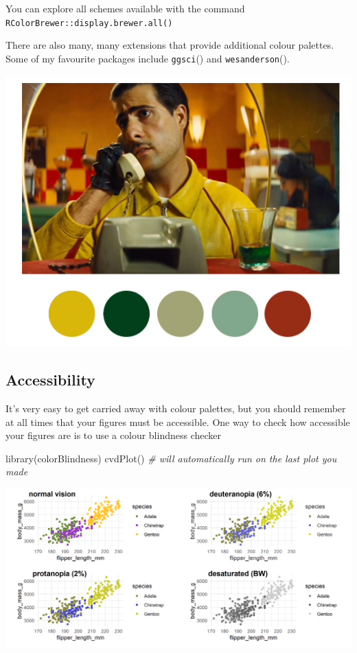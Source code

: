 \documentclass[
]{book}
\makeatletter
\newenvironment{Shaded}{\begin{snugshade}}{\end{snugshade}}
\newcommand{\CommentTok}[1]{\textcolor[rgb]{0.56,0.35,0.01}{\textit{#1}}}
\newcommand{\FunctionTok}[1]{\textcolor[rgb]{0.00,0.00,0.00}{#1}}
\newcommand{\NormalTok}[1]{#1}
\newenvironment{kframe}{%
\medskip{}
\setlength{\fboxsep}{.8em}
 \def\at@end@of@kframe{}%
 \ifinner\ifhmode%
  \def\at@end@of@kframe{\end{minipage}}%
  \begin{minipage}{\columnwidth}%
 \fi\fi%
 \def\FrameCommand##1{\hskip\@totalleftmargin \hskip-\fboxsep
 \colorbox{shadecolor}{##1}\hskip-\fboxsep
     \hskip-\linewidth \hskip-\@totalleftmargin \hskip\columnwidth}%
 \MakeFramed {\advance\hsize-\width
   \@totalleftmargin\z@ \linewidth\hsize
   \@setminipage}}%
 {\par\unskip\endMakeFramed%
 \at@end@of@kframe}
\newenvironment{block}[1]
  {
  \begin{itemize}
  \renewcommand{\labelitemi}{
    \raisebox{-.7\height}[0pt][0pt]{
      {\setkeys{Gin}{width=3em,keepaspectratio}\texttt{[image: images/\#1]}}
    }
  }
  \setlength{\fboxsep}{1em}
  \begin{kframe}
  \item
  }
  {
  \end{kframe}
  \end{itemize}
  }
\newenvironment{rmdwarning}
  {\begin{block}{warning}}
  {\end{block}}
\makeatother
\begin{document}
\begin{rmdwarning}
You can explore all schemes available with the command
\texttt{RColorBrewer::display.brewer.all()}
\end{rmdwarning}

There are also many, many extensions that provide additional colour palettes. Some of my favourite packages include \texttt{ggsci}(\citet{R-ggsci}) and \texttt{wesanderson}(\citet{R-wesanderson}).

\includegraphics[width=0.8\linewidth]{images/wesanderson}

\hypertarget{accessibility}{%
\subsection{Accessibility}\label{accessibility}}

It's very easy to get carried away with colour palettes, but you should remember at all times that your figures must be accessible. One way to check how accessible your figures are is to use a colour blindness checker \citet{R-colorBlindness}

\begin{Shaded}
\begin{Highlighting}[]
\FunctionTok{library}\NormalTok{(colorBlindness)}
\FunctionTok{cvdPlot}\NormalTok{() }\CommentTok{\# will automatically run on the last plot you made}
\end{Highlighting}
\end{Shaded}

\includegraphics[width=0.8\linewidth]{images/colorblind}
\end{document}
